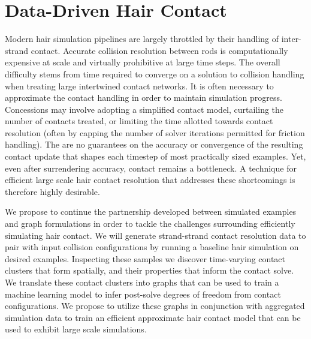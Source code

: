\documentclass[12pt]{report}
\begin{document}
\chapter{Data-Driven Hair Contact}\label{plan}
Modern hair simulation pipelines are largely throttled by their handling
of inter-strand contact. 
Accurate collision resolution between rods is
computationally expensive at scale and virtually prohibitive at large time
steps. 
The overall difficulty stems from time required to converge
on a solution to collision handling when treating large intertwined contact networks.
It is often necessary to approximate the contact handling in order
to maintain simulation progress. 
Concessions may involve adopting
a simplified contact model, curtailing the number of contacts treated, 
or limiting the time allotted towards contact resolution 
(often by capping the number of solver iterations permitted for friction handling). 
The are no guarantees
on the accuracy or convergence of the resulting contact update that
shapes each timestep of most practically sized examples.
Yet, even after surrendering accuracy, contact remains a bottleneck.
A technique for efficient large scale hair contact resolution
that addresses these shortcomings is therefore highly desirable.

We propose to continue the partnership developed between 
simulated examples and graph formulations
in order to tackle the challenges
surrounding efficiently simulating hair contact.
We will generate strand-strand contact resolution data
to pair with input collision configurations
by running a baseline hair simulation on desired examples.
Inspecting these samples we discover time-varying contact clusters
that form spatially, and their properties that inform the contact solve.
We translate these contact clusters into graphs that can be used
to train a machine learning model to infer post-solve degrees of freedom
from contact configurations.
We propose to utilize these graphs in conjunction with aggregated simulation
data to train an efficient approximate hair contact model that can be used
to exhibit large scale simulations.
\end{document}

